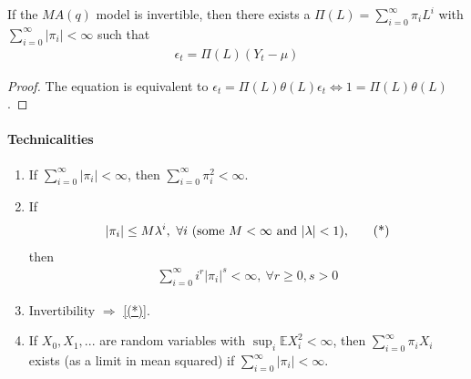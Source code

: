 \documentclass[11pt]{elegantbook}
\begin{document}
\begin{lemma}
    If the $MA(q)$ model is invertible, then there exists a $\Pi(L)=\sum_{i=0}^\infty \pi_i L^i$ with $\sum_{i=0}^\infty |\pi_i|<\infty$ such that
    \begin{equation}
        \begin{aligned}
            \epsilon_t=\Pi(L)(Y_t-\mu)
        \end{aligned}
        \nonumber
    \end{equation}
\end{lemma}
\begin{proof}
    The equation is equivalent to $\epsilon_t=\Pi(L)\theta(L)\epsilon_t \Leftrightarrow 1=\Pi(L)\theta(L)$.
\end{proof}

\paragraph*{Technicalities}
\begin{enumerate}[$\circ$]
    \item If $\sum_{i=0}^\infty |\pi_i|<\infty$, then $\sum_{i=0}^\infty\pi_i^2<\infty$.
    \item If
    \begin{equation}
        \begin{aligned}
            |\pi_i|\leq M \lambda^i,\ \forall i \textnormal{ (some $M<\infty$ and $|\lambda|<1$)},
        \end{aligned}
        \label{(*)}
        \tag{*}
    \end{equation}
    then
    \begin{equation}
        \begin{aligned}
            \sum_{i=0}^\infty i^r|\pi_i|^s<\infty,\ \forall r\geq 0,s>0
        \end{aligned}
        \nonumber
    \end{equation}
    \item Invertibility $\Rightarrow$ \eqref{(*)}.
    \item If $X_0,X_1,...$ are random variables with $\sup_i \mathbb{E}X_i^2<\infty$, then $\sum_{i=0}^\infty \pi_i X_i$ exists (as a limit in mean squared) if $\sum_{i=0}^\infty |\pi_i|<\infty$.
\end{enumerate}
\end{document}
